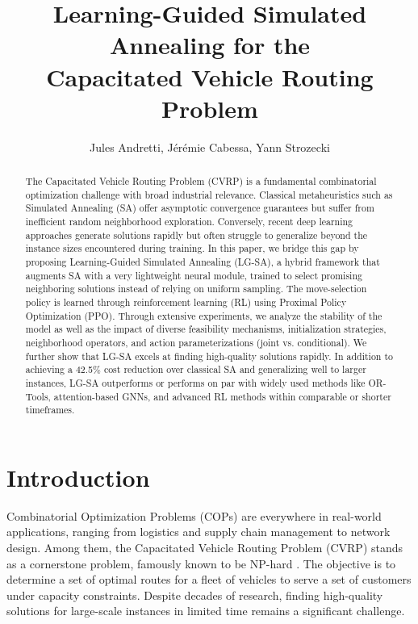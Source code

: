 \documentclass[letterpaper]{article} %
\title{Learning-Guided Simulated Annealing for the\\Capacitated Vehicle Routing Problem}
\author{
Jules Andretti,
Jérémie Cabessa,
Yann Strozecki
}
\begin{document}
\maketitle

\begin{abstract}
The Capacitated Vehicle Routing Problem (CVRP) is a fundamental combinatorial optimization challenge with broad industrial relevance. Classical metaheuristics such as Simulated Annealing (SA) offer asymptotic convergence guarantees but suffer from inefficient random neighborhood exploration. Conversely, recent deep learning approaches generate solutions rapidly but often struggle to generalize beyond the instance sizes encountered during training. In this paper, we bridge this gap by proposing Learning-Guided Simulated Annealing (LG-SA), a hybrid framework that augments SA with a very lightweight neural module, trained to select promising neighboring solutions instead of relying on uniform sampling. The move-selection policy is learned through reinforcement learning (RL) using Proximal Policy Optimization (PPO). Through extensive experiments, we analyze the stability of the model as well as the impact of diverse feasibility mechanisms, initialization strategies, neighborhood operators, and action parameterizations (joint vs. conditional). We further show that LG-SA excels at finding high-quality solutions rapidly. In addition to achieving a 42.5\% cost reduction over classical SA and generalizing well to larger instances, LG-SA outperforms or performs on par with widely used methods like OR-Tools, attention-based GNNs, and advanced RL methods within comparable or shorter timeframes.
\end{abstract}


\section{Introduction}

Combinatorial Optimization Problems (COPs) are everywhere in real-world applications, ranging from logistics and supply chain management to network design. Among them, the Capacitated Vehicle Routing Problem (CVRP) stands as a cornerstone problem, famously known to be NP-hard \cite{dantzig_truck_1959, liu_heuristics_2023, shi_brief_2023, bogyrbayeva_learning_2022}. The objective is to determine a set of optimal routes for a fleet of vehicles to serve a set of customers under capacity constraints. Despite decades of research, finding high-quality solutions for large-scale instances in limited time remains a significant challenge.
\end{document}
